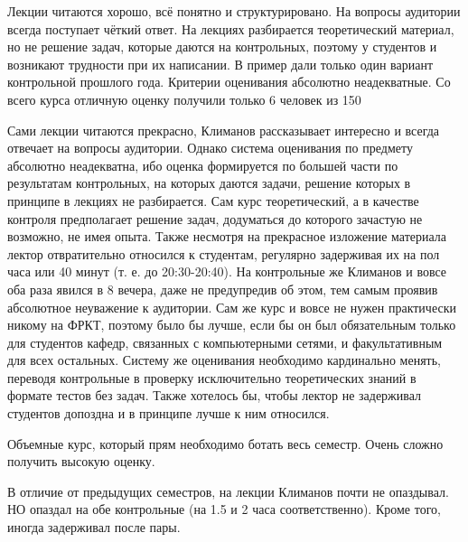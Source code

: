             \begin{commentbox} 
                Лекции читаются хорошо, всё понятно и структурировано. На вопросы аудитории всегда поступает чёткий ответ. На лекциях разбирается теоретический материал, но не решение задач, которые даются на контрольных,  поэтому у студентов и возникают трудности при их  написании. В пример дали только один вариант контрольной прошлого года. Критерии оценивания абсолютно неадекватные. Со всего курса отличную оценку получили только 6 человек из 150 
            \end{commentbox} 
        
            \begin{commentbox} 
                Сами лекции читаются прекрасно, Климанов рассказывает интересно и всегда отвечает на вопросы аудитории. Однако система оценивания по предмету абсолютно неадекватна, ибо оценка формируется по большей части по результатам контрольных, на которых даются задачи, решение которых в принципе в лекциях не разбирается. Сам курс теоретический, а в качестве контроля предполагает решение задач, додуматься до которого зачастую не возможно, не имея опыта. Также несмотря на прекрасное изложение материала лектор отвратительно относился к студентам, регулярно задерживая их на пол часа или 40 минут (т. е. до 20:30-20:40). На контрольные же Климанов и вовсе оба раза явился в 8 вечера, даже не предупредив об этом, тем самым проявив абсолютное неуважение к аудитории. Сам же курс и вовсе не нужен практически никому на ФРКТ, поэтому было бы лучше, если бы он был обязательным только для студентов кафедр, связанных с компьютерными сетями, и факультативным для всех остальных. Систему же оценивания необходимо кардинально менять, переводя контрольные в проверку исключительно теоретических знаний в формате тестов без задач. Также хотелось бы, чтобы лектор не задерживал студентов допоздна и в принципе лучше к ним относился. 
            \end{commentbox} 
        
            \begin{commentbox} 
                Объемные курс, который прям необходимо ботать весь семестр. Очень сложно получить высокую оценку.
        
                В отличие от предыдущих семестров, на лекции Климанов почти не опаздывал. НО опаздал на обе контрольные (на 1.5 и 2 часа соответственно). Кроме того, иногда задерживал после пары. 
            \end{commentbox} 
        
